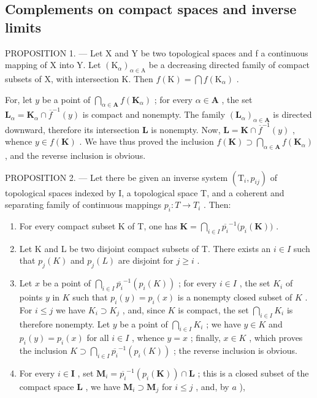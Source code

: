 \subsection{Complements on compact spaces and inverse limits}

PROPOSITION 1. --- Let X and Y be two topological spaces and f a continuous mapping of X into Y. Let \((\mathrm{K}_{\alpha})_{\alpha \in \mathrm{A}}\) be a decreasing directed family of compact subsets of X, with intersection K. Then \(f(\mathrm{K}) = \bigcap f(\mathrm{K}_{\alpha})\) .

For, let \(y\) be a point of \(\bigcap_{\alpha \in \mathbf{A}} f(\mathbf{K}_{\alpha})\) ; for every \(\alpha \in \mathbf{A}\) , the set \(\mathbf{L}_{\alpha} = \mathbf{K}_{\alpha} \cap \overline{f}^{-1}(y)\) is compact and nonempty. The family \((\mathbf{L}_{\alpha})_{\alpha \in \mathbf{A}}\) is directed downward, therefore its intersection \(\mathbf{L}\) is nonempty. Now, \(\mathbf{L} = \mathbf{K} \cap \overline{f}^{-1}(y)\) , whence \(y \in f(\mathbf{K})\) . We have thus proved the inclusion \(f(\mathbf{K}) \supset \bigcap_{\alpha \in \mathbf{A}} f(\mathbf{K}_{\alpha})\) , and the reverse inclusion is obvious.

PROPOSITION 2. --- Let there be given an inverse system \((\mathrm{T}_{i}, p_{ij})\) of topological spaces indexed by I, a topological space T, and a coherent and separating family of continuous mappings \(p_{i}: T \to T_{i}\) . Then:

\begin{enumerate}
\def\labelenumi{\alph{enumi})}
\item
  For every compact subset K of T, one has \(\mathbf{K} = \bigcap_{i\in I}\overline{p_i}^{-1}\big(p_i(\mathbf{K})\big)\) .
\item
  Let K and L be two disjoint compact subsets of T. There exists an \(i \in I\) such that \(p_{j}(K)\) and \(p_{j}(L)\) are disjoint for \(j \geqslant i\) .
\item
  Let \(x\) be a point of \(\bigcap_{i \in I} \overline{p_i}^{-1}(p_i(K))\) ; for every \(i \in I\) , the set \(K_i\) of points \(y\) in \(K\) such that \(p_i(y) = p_i(x)\) is a nonempty closed subset of \(K\) . For \(i \leqslant j\) we have \(K_i \supset K_j\) , and, since \(K\) is compact, the set \(\bigcap_{i \in I} K_i\) is therefore nonempty. Let \(y\) be a point of \(\bigcap_{i \in I} K_i\) ; we have \(y \in K\) and \(p_i(y) = p_i(x)\) for all \(i \in I\) , whence \(y = x\) ; finally, \(x \in K\) , which proves the inclusion \(K \supset \bigcap_{i \in I} \overline{p_i}^{-1}(p_i(K))\) ; the reverse inclusion is obvious.
\item
  For every \(i \in \mathbf{I}\) , set \(\mathbf{M}_i = \overline{p_i}^{-1}(p_i(\mathbf{K})) \cap \mathbf{L}\) ; this is a closed subset of the compact space \(\mathbf{L}\) , we have \(\mathbf{M}_i \supset \mathbf{M}_j\) for \(i \leqslant j\) , and, by \(a\) ),
\end{enumerate}

